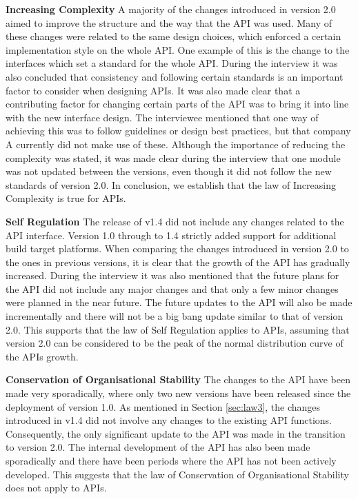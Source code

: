 \documentclass{sig-alternate}
\begin{document}
\smallskip \noindent
\textbf{Increasing Complexity  } \label{sec:law2} 
A majority of the changes introduced in version 2.0 aimed to improve the structure and the way that the API was used. Many of these changes were related to the same design choices, which enforced a certain implementation style on the whole API. One example of this is the change to the interfaces which set a standard for the whole API. During the interview it was also concluded that consistency and following certain standards is an important factor to consider when designing APIs. It was also made clear that a contributing factor for changing certain parts of the API was to bring it into line with the new interface design. The interviewee mentioned that one way of achieving this was to follow guidelines or design best practices, but that company A currently did not make use of these. Although the importance of reducing the complexity was stated, it was made clear during the interview that one module was not updated between the versions, even though it did not follow the new standards of version 2.0. In conclusion, we establish that the law of Increasing Complexity is true for APIs. 

\smallskip \noindent
\textbf{Self Regulation  } \label{sec:law3} 
The release of v1.4 did not include any changes related to the API interface. Version 1.0 through to 1.4 strictly added support for additional build target platforms. When comparing the changes introduced in version 2.0 to the ones in previous versions, it is clear that the growth of the API has gradually increased. During the interview it was also mentioned that the future plans for the API did not include any major changes and that only a few minor changes were planned in the near future. The future updates to the API will also be made incrementally and there will not be a big bang update similar to that of version 2.0. This supports that the law of Self Regulation applies to APIs, assuming that version 2.0 can be considered to be the peak of the normal distribution curve of the APIs growth. 

\smallskip \noindent
\textbf{Conservation of Organisational Stability  } 
The changes to the API have been made very sporadically, where only two new versions have been released since the deployment of version 1.0. As mentioned in Section \ref{sec:law3}, the changes introduced in v1.4 did not involve any changes to the existing API functions. Consequently, the only significant update to the API was made in the transition to version 2.0. The internal development of the API has also been made sporadically and there have been periods where the API has not been actively developed. This suggests that the law of Conservation of Organisational Stability does not apply to APIs. 
\end{document}
